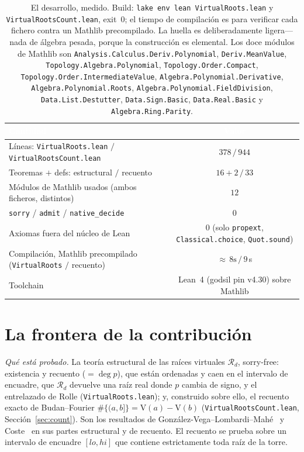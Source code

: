 \documentclass[11pt]{article}
\newcommand{\lean}[1]{\texttt{#1}}
\newcommand{\V}{\mathrm{V}}
\newcommand{\Rd}{\mathcal{R}}
\begin{document}
\begin{table}[H]
  \centering\footnotesize
  \begin{tabular}{@{}lc@{}}
    \toprule
    \rowcolor{ggteal}
    \textcolor{white}{\textbf{Cantidad}} & \textcolor{white}{\textbf{Valor}} \\
    \midrule
    \rowcolor{ggband}
    L\'ineas: \lean{VirtualRoots.lean} $/$ \lean{VirtualRootsCount.lean} & $378\,/\,944$ \\
    Teoremas $+$ defs: estructural $/$ recuento & $16{+}2\,/\,33$ \\
    \rowcolor{ggband}
    M\'odulos de Mathlib usados (ambos ficheros, distintos) & $12$ \\
    \lean{sorry} / \lean{admit} / \lean{native\_decide} & $0$ \\
    Axiomas fuera del n\'ucleo de Lean & $0$ (solo \lean{propext}, \lean{Classical.choice}, \lean{Quot.sound}) \\
    \rowcolor{ggband}
    Compilaci\'on, Mathlib precompilado (\lean{VirtualRoots} $/$ recuento) & ${\approx}\,8\text{s}\,/\,9$\,s \\
    Toolchain & Lean~4 (godsil pin v4.30) sobre Mathlib \\
    \bottomrule
  \end{tabular}
  \caption{El desarrollo, medido. Build: \lean{lake env lean VirtualRoots.lean} y
  \lean{VirtualRootsCount.lean}, exit~0; el tiempo de compilaci\'on es para verificar cada fichero
  contra un Mathlib precompilado. La huella es deliberadamente ligera---nada de \'algebra pesada,
  porque la construcci\'on es elemental. Los doce m\'odulos de Mathlib son
  \lean{Analysis.Calculus.Deriv.Polynomial}, \lean{Deriv.MeanValue}, \lean{Topology.Algebra.Polynomial},
  \lean{Topology.Order.Compact}, \lean{Topology.Order.IntermediateValue},
  \lean{Algebra.Polynomial.Derivative}, \lean{Algebra.Polynomial.Roots},
  \lean{Algebra.Polynomial.FieldDivision}, \lean{Data.List.Destutter}, \lean{Data.Sign.Basic},
  \lean{Data.Real.Basic} y \lean{Algebra.Ring.Parity}.}
  \label{tab:metrics}
\end{table}

\section{La frontera de la contribuci\'on}\label{sec:boundary}

\emph{Qu\'e est\'a probado.} La teor\'ia estructural de las ra\'ices virtuales $\Rd_d$, sorry-free:
existencia y recuento ($=\deg p$), que est\'an ordenadas y caen en el intervalo de encuadre, que
$\Rd_d$ devuelve una ra\'iz real donde $p$ cambia de signo, y el entrelazado de Rolle
(\lean{VirtualRoots.lean}); y, construido sobre ello, el recuento exacto de Budan--Fourier
$\#\{(a,b]\}=\V(a)-\V(b)$ (\lean{VirtualRootsCount.lean}, Secci\'on~\ref{sec:count}). Son los resultados
de Gonz\'alez-Vega--Lombardi--Mah\'e~\cite{glm} y Coste~\cite{coste} en sus partes estructural y de
recuento. El recuento se prueba sobre un intervalo de encuadre $[lo,hi]$ que contiene estrictamente
toda ra\'iz de la torre.
\end{document}
